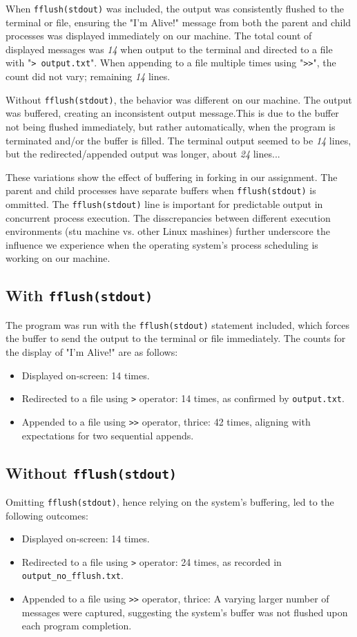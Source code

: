 \documentclass[12pt]{article}
\begin{document}
When \texttt{fflush(stdout)} was included, the output was consistently flushed to the terminal or file, ensuring the "I'm Alive!" message from both the parent and child processes was displayed immediately on our machine. The total count of displayed messages was \textit{14} when output to the terminal and directed to a file with "\texttt{> output.txt}". When appending to a file multiple times using "\texttt{>>}", the count did not vary; remaining \textit{14} lines.

Without \texttt{fflush(stdout)}, the behavior was different on our machine. The output was buffered, creating an inconsistent output message.This is due to the buffer not being flushed immediately, but rather automatically, when the program is terminated and/or the buffer is filled. The terminal output seemed to be \textit{14} lines, but the redirected/appended output was longer, about \textit{24} lines...

These variations show the effect of buffering in forking in our assignment. The parent and child processes have separate buffers when \texttt{fflush(stdout)} is ommitted. The \texttt{fflush(stdout)} line is important for predictable output in concurrent process execution. The disscrepancies between different execution environments (stu machine vs. other Linux mashines) further underscore the influence we experience when the operating system's process scheduling is working on our machine.

\subsection{With \texttt{fflush(stdout)}}
The program was run with the \texttt{fflush(stdout)} statement included, which forces the buffer to send the output to the terminal or file immediately. The counts for the display of "I'm Alive!" are as follows:
\begin{itemize}
  \item Displayed on-screen: 14 times.
  \item Redirected to a file using \texttt{>} operator: 14 times, as confirmed by \texttt{output.txt}.
  \item Appended to a file using \texttt{>>} operator, thrice: 42 times, aligning with expectations for two sequential appends.
\end{itemize}

\subsection{Without \texttt{fflush(stdout)}}
Omitting \texttt{fflush(stdout)}, hence relying on the system's buffering, led to the following outcomes:
\begin{itemize}
  \item Displayed on-screen: 14 times.
  \item Redirected to a file using \texttt{>} operator: 24 times, as recorded in \texttt{output\_no\_fflush.txt}.
  \item Appended to a file using \texttt{>>} operator, thrice: A varying larger number of messages were captured, suggesting the system's buffer was not flushed upon each program completion.
\end{itemize}
\end{document}

